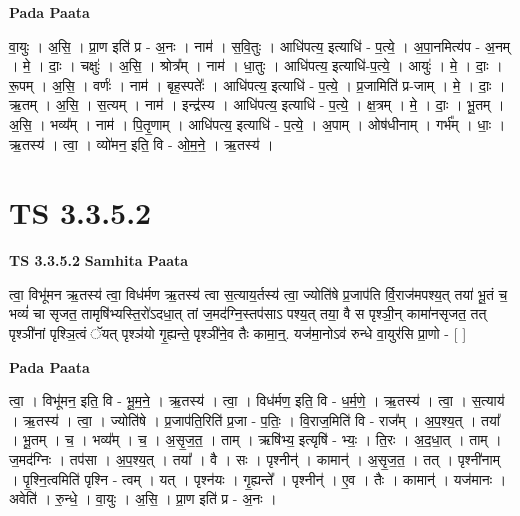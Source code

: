 \documentclass[17pt]{extarticle}
\begin{document}
\textbf{Pada Paata} \newline

वा॒युः । अ॒सि॒ । प्रा॒ण इति॑ प्र - अ॒नः । नाम॑ । स॒वि॒तुः । आधि॑पत्य॒ इत्याधि॑ - प॒त्ये॒ । अ॒पा॒नमित्य॑प - अ॒नम् । मे॒ । दाः॒ । चक्षुः॑ । अ॒सि॒ । श्रोत्र᳚म् । नाम॑ । धा॒तुः । आधि॑पत्य॒ इत्याधि॑-प॒त्ये॒ । आयुः॑ । मे॒ । दाः॒ । रू॒पम् । अ॒सि॒ । वर्णः॑ । नाम॑ । बृह॒स्पतेः᳚ । आधि॑पत्य॒ इत्याधि॑ - प॒त्ये॒ । प्र॒जामिति॑ प्र-जाम् । मे॒ । दाः॒ । ऋ॒तम् । अ॒सि॒ । स॒त्यम् । नाम॑ । इन्द्र॑स्य । आधि॑पत्य॒ इत्याधि॑ - प॒त्ये॒ । क्ष॒त्रम् । मे॒ । दाः॒ । भू॒तम् । अ॒सि॒ । भव्य᳚म् । नाम॑ । पि॒तृ॒णाम् । आधि॑पत्य॒ इत्याधि॑ - प॒त्ये॒ । अ॒पाम् । ओष॑धीनाम् । गर्भ᳚म् । धाः॒ । ऋ॒तस्य॑ । त्वा॒ । व्यो॑मन॒ इति॒ वि - ओ॒म॒ने॒ । ऋ॒तस्य॑ ।  \newline





\section{ TS 3.3.5.2 }

\textbf{TS 3.3.5.2 } \newline
\textbf{Samhita Paata} \newline

त्वा॒ विभू॑मन ऋ॒तस्य॑ त्वा॒ विध॑र्मण ऋ॒तस्य॑ त्वा स॒त्याय॒र्तस्य॑ त्वा॒ ज्योति॑षे प्र॒जाप॑ति र्वि॒राज॑मपश्य॒त् तया॑ भू॒तं च॒ भव्यं॑ चा सृजत॒ तामृषि॑भ्यस्ति॒रो॑ऽदधा॒त् तां ज॒मद॑ग्नि॒स्तप॑साऽ पश्य॒त् तया॒ वै स पृश्ञी॒न् कामा॑नसृजत॒ तत् पृश्ञी॑नां पृश्ञि॒त्वं ॅयत् पृश्ञ॑यो गृ॒ह्यन्ते॒ पृश्ञी॑ने॒व तैः कामा॒न्॒. यज॑मा॒नोऽव॑ रुन्धे वा॒युर॑सि प्रा॒णो - [  ] \newline

\textbf{Pada Paata} \newline

त्वा॒ । विभू॑मन॒ इति॒ वि - भू॒म॒ने॒ । ऋ॒तस्य॑ । त्वा॒ । विध॑र्मण॒ इति॒ वि - ध॒र्म॒णे॒ । ऋ॒तस्य॑ । त्वा॒ । स॒त्याय॑ । ऋ॒तस्य॑ । त्वा॒ । ज्योति॑षे । प्र॒जाप॑ति॒रिति॑ प्र॒जा - प॒तिः॒ । वि॒राज॒मिति॑ वि - राज᳚म् । अ॒प॒श्य॒त् । तया᳚ । भू॒तम् । च॒ । भव्य᳚म् । च॒ । अ॒सृ॒ज॒त॒ । ताम् । ऋषि॑भ्य॒ इत्यृषि॑ - भ्यः॒ । ति॒रः । अ॒द॒धा॒त् । ताम् । ज॒मद॑ग्निः । तप॑सा । अ॒प॒श्य॒त् । तया᳚ । वै । सः । पृश्नीन्॑ । कामान्॑ । अ॒सृ॒ज॒त॒ । तत् । पृश्नी॑नाम् । पृ॒श्नि॒त्वमिति॑ पृश्नि - त्वम् । यत् । पृश्न॑यः । गृ॒ह्यन्ते᳚ । पृश्नीन्॑ । ए॒व । तैः । कामान्॑ । यज॑मानः । अवेति॑ । रु॒न्धे॒ । वा॒युः । अ॒सि॒ । प्रा॒ण इति॑ प्र - अ॒नः ।  \newline
\end{document}
